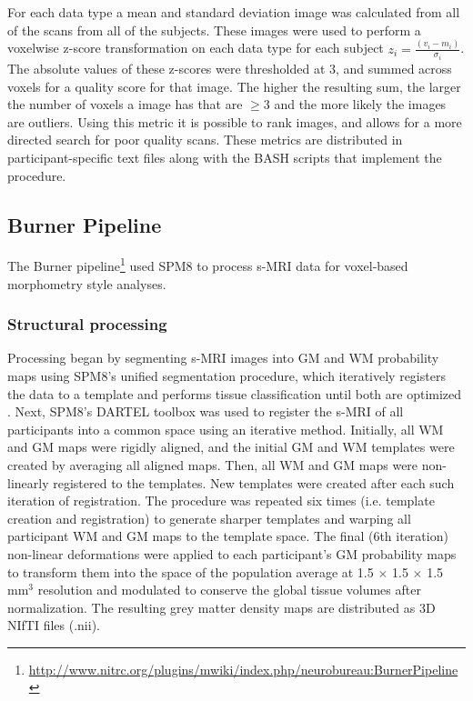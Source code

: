 \documentclass[preprint,12pt,3p]{elsarticle}
\begin{document}
For each data type a mean and standard deviation image was calculated from all of the scans from all of the subjects. These images were used to perform a voxelwise z-score transformation on each data type for each subject $z_i = \frac{(v_i-m_i)}{\sigma_i}$. The absolute values of these z-scores were thresholded at 3, and summed across voxels for a quality score for that image. The higher the resulting sum, the larger the number of voxels a image has that are $\geq 3$ and the more likely the images are outliers. Using this metric it is possible to rank images, and allows for a more directed search for poor quality scans. These metrics are distributed in participant-specific text files along with the BASH scripts that implement the procedure.

\subsection{Burner Pipeline}

The Burner pipeline\footnote{\url{http://www.nitrc.org/plugins/mwiki/index.php/neurobureau:BurnerPipeline}} used SPM8 \cite{ashburner2012spm8} to process s-MRI data for voxel-based morphometry \cite{ashburner2000vbm} style analyses.

\subsubsection{Structural processing} 
Processing began by segmenting s-MRI images into GM and WM probability maps using SPM8's unified segmentation procedure, which iteratively registers the data to a template and performs tissue classification until both are optimized \cite{ashburner2005unified}. Next, SPM8's DARTEL toolbox \cite{ashburner2007dartel} was used to register the s-MRI of all participants into a common space using an iterative method. Initially, all WM and GM maps were rigidly aligned, and the initial GM and WM templates were created by averaging all aligned maps. Then, all WM and GM maps were non-linearly registered to the templates. New templates were created after each such iteration of registration. The procedure was repeated six times (i.e. template creation and registration) to generate sharper templates and warping all participant WM and GM maps to the template space. The final (6th iteration) non-linear deformations were applied to each participant's GM probability maps to transform them into the space of the population average at 1.5 $\times$ 1.5 $\times$ 1.5 mm$^3$ resolution and modulated to conserve the global tissue volumes after normalization. The resulting grey matter density maps are distributed as 3D NIfTI files (.nii).
\end{document}
